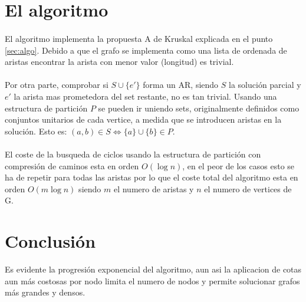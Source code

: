 \documentclass{article}
\begin{document}
\section{El algoritmo}
\paragraph{}El algoritmo implementa la propuesta A de Kruskal explicada en el punto \ref{sec:algo}. Debido a que el grafo se implementa como una lista de ordenada de aristas encontrar la arista con menor valor (longitud) es trivial.
\paragraph{}Por otra parte, comprobar si $S\cup\{e'\}$ forma un AR, siendo $S$ la solución parcial y $e'$ la arista mas prometedora del set restante, no es tan trivial. 
Usando una estructura de partición $P$ se pueden ir uniendo sets, originalmente definidos como conjuntos unitarios de cada vertice, a medida que se introducen aristas en la solución.
Esto es: $(a, b)\in S \Leftrightarrow \{a\}\cup \{b\} \in P$.
\paragraph{} El coste de la busqueda de ciclos usando la estructura de partición con compresión de caminos esta en orden $O(\log{n})$, 
en el peor de los casos esto se ha de repetir para todas las aristas por lo que el coste total del algoritmo esta en orden $O(m\log{n})$ siendo $m$ el numero de aristas y $n$ el numero de vertices de G.
\section{Conclusión}
Es evidente la progresión exponencial del algoritmo, aun asi la aplicacion de cotas aun más costosas por nodo limita el numero de nodos y permite solucionar grafos más grandes y densos.
\end{document}
